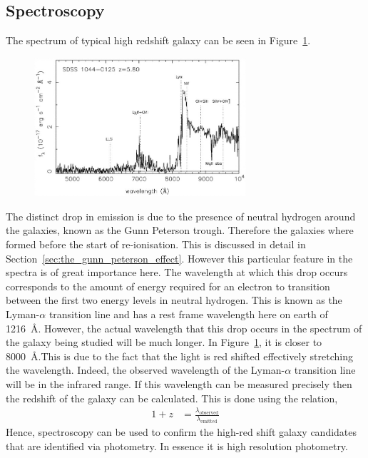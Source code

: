 \subsection{Spectroscopy} %
\label{sec:spectroscopy}
	The spectrum of typical high redshift galaxy can be seen in Figure~\ref{fig:high_redshift_galaxy_spectrum}.
	\begin{figure}[!htbp]
		\centering
			\includegraphics[width=0.7\textwidth]{../Images/high_redshift_galaxy_spec.jpg}
		\caption{\label{fig:high_redshift_galaxy_spectrum}}
	\end{figure}

	The distinct drop in emission is due to the presence of neutral hydrogen around the galaxies, known as the Gunn Peterson trough. Therefore the galaxies where formed before the start of re-ionisation. This is discussed in detail in Section~\ref{sec:the_gunn_peterson_effect}. However this particular feature in the spectra is of great importance here. The wavelength at which this drop occurs corresponds to the amount of energy required for an electron to transition between the first two energy levels in neutral hydrogen. This is known as the Lyman-$\alpha$ transition line and has a rest frame wavelength here on earth of \SI{1216}{\angstrom}\cite{rauch2001lyman}. However, the actual wavelength that this drop occurs in the spectrum of the galaxy being studied will be much longer. In Figure~\ref{fig:high_redshift_galaxy_spectrum}, it is closer to \SI{8000}{\angstrom}.This is due to the fact that the light is red shifted effectively stretching the wavelength. Indeed, the observed wavelength of the Lyman-$\alpha$ transition line will be in the infrared range. If this wavelength can be measured precisely then the redshift of the galaxy can be calculated\cite{rauch2001lyman}. This is done using the relation,
	\begin{align}
		1+z &= \frac{\lambda_{\text{observed}}}{\lambda_{\text{emitted}}} \label{eq:spectroscopy}
	\end{align}
	Hence, spectroscopy can be used to confirm the high-red shift galaxy candidates that are identified via photometry. In essence it is high resolution photometry.

